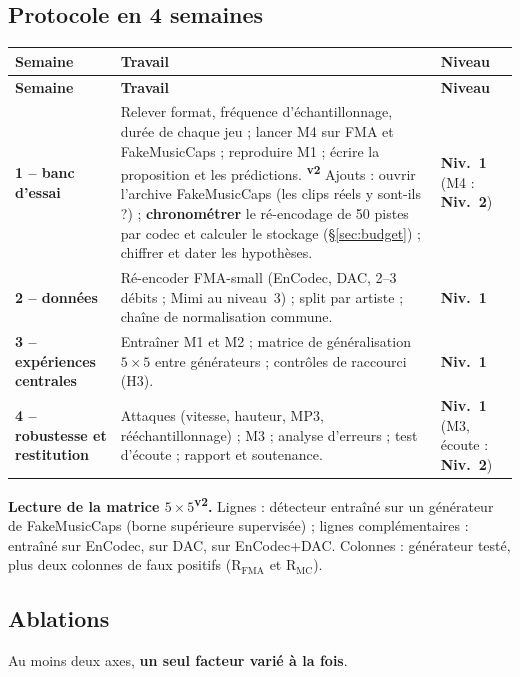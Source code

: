 \documentclass[11pt,a4paper]{article}
\newcommand{\vtwo}{\textsuperscript{\textcolor{orange!80!black}{\textbf{v2}}}}
\newcommand{\nA}{\textbf{Niv.~1}}  %
\newcommand{\nB}{\textbf{Niv.~2}}  %
\begin{document}
\subsection{Protocole en 4 semaines}\label{sec:protocole}

{\small
\begin{longtable}{L{2.4cm}L{10.6cm}L{2.3cm}}
\toprule
\textbf{Semaine} & \textbf{Travail} & \textbf{Niveau}\\
\midrule
\endfirsthead
\toprule
\textbf{Semaine} & \textbf{Travail} & \textbf{Niveau}\\
\midrule
\endhead
\bottomrule
\endfoot
\textbf{1 -- banc d'essai} & Relever format, fréquence d'échantillonnage, durée de chaque jeu ; lancer M4 sur FMA et FakeMusicCaps ; reproduire M1 ; écrire la proposition et les prédictions. \vtwo{} Ajouts : ouvrir l'archive FakeMusicCaps (les clips réels y sont-ils ?) ; \textbf{chronométrer} le ré-encodage de 50 pistes par codec et calculer le stockage (§\ref{sec:budget}) ; chiffrer et dater les hypothèses. & \nA{} (M4 : \nB)\\
\addlinespace
\textbf{2 -- données} & Ré-encoder FMA-small (EnCodec, DAC, 2--3 débits ; Mimi au niveau~3) ; split par artiste ; chaîne de normalisation commune. & \nA\\
\addlinespace
\textbf{3 -- expériences centrales} & Entraîner M1 et M2 ; matrice de généralisation $5\times5$ entre générateurs ; contrôles de raccourci (H3). & \nA\\
\addlinespace
\textbf{4 -- robustesse et restitution} & Attaques (vitesse, hauteur, MP3, rééchantillonnage) ; M3 ; analyse d'erreurs ; test d'écoute ; rapport et soutenance. & \nA{} (M3, écoute : \nB)\\
\end{longtable}}

\textbf{Lecture de la matrice $5\times5$\vtwo.} Lignes : détecteur entraîné sur un générateur de FakeMusicCaps (borne supérieure supervisée) ; lignes complémentaires : entraîné sur EnCodec, sur DAC, sur EnCodec+DAC. Colonnes : générateur testé, plus deux colonnes de faux positifs (R$_{\text{FMA}}$ et R$_{\text{MC}}$).

\subsection{Ablations}\label{sec:ablations}
Au moins deux axes, \textbf{un seul facteur varié à la fois}.
\end{document}
